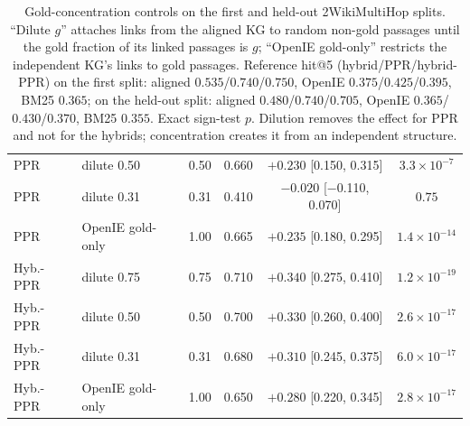 \documentclass[11pt]{article}
\begin{document}
\begin{table}[ht]
{\begin{tabular}{llcccc}
PPR & dilute 0.50 & 0.50 & 0.660 & $+0.230$ [0.150, 0.315] & $3.3\times10^{-7}$\\
PPR & dilute 0.31 & 0.31 & 0.410 & $-0.020$ [$-$0.110, 0.070] & $0.75$\\
PPR & OpenIE gold-only & 1.00 & 0.665 & $+0.235$ [0.180, 0.295] & $1.4\times10^{-14}$\\
Hyb.-PPR & dilute 0.75 & 0.75 & 0.710 & $+0.340$ [0.275, 0.410] & $1.2\times10^{-19}$\\
Hyb.-PPR & dilute 0.50 & 0.50 & 0.700 & $+0.330$ [0.260, 0.400] & $2.6\times10^{-17}$\\
Hyb.-PPR & dilute 0.31 & 0.31 & 0.680 & $+0.310$ [0.245, 0.375] & $6.0\times10^{-17}$\\
Hyb.-PPR & OpenIE gold-only & 1.00 & 0.650 & $+0.280$ [0.220, 0.345] & $2.8\times10^{-17}$\\
\bottomrule
\end{tabular}}
\caption{Gold-concentration controls on the first and held-out 2WikiMultiHop splits. ``Dilute $g$'' attaches links from the aligned KG to random non-gold passages until the gold fraction of its linked passages is $g$; ``OpenIE gold-only'' restricts the independent KG's links to gold passages. Reference hit@5 (hybrid/PPR/hybrid-PPR) on the first split: aligned $0.535$/$0.740$/$0.750$, OpenIE $0.375$/$0.425$/$0.395$, BM25 $0.365$; on the held-out split: aligned $0.480$/$0.740$/$0.705$, OpenIE $0.365$/$0.430$/$0.370$, BM25 $0.355$. Exact sign-test $p$. Dilution removes the effect for PPR and not for the hybrids; concentration creates it from an independent structure.}
\label{tab:concentration}
\end{table}
\end{document}

